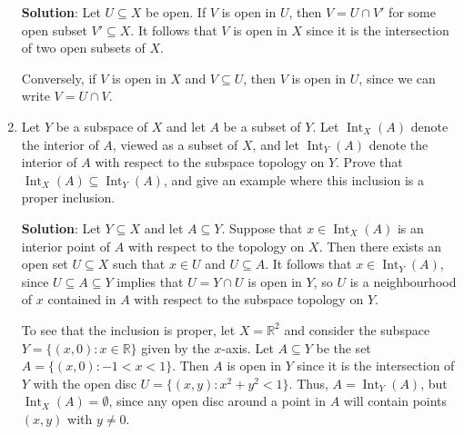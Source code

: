 \documentclass[letterpaper,12pt]{article}
\newcommand{\R}{\mathbb{R}}
\DeclareMathOperator{\Int}{Int}
\begin{document}
\begin{enumerate}
\bigskip

{\bf Solution}: Let $U\subseteq X$ be open. If $V$ is open in $U$, then $V = U\cap V'$ for some open subset $V'\subseteq X$. It follows that $V$ is open in $X$ since it is the intersection of two open subsets of $X$.

Conversely, if $V$ is open in $X$ and $V\subseteq U$, then $V$ is open in $U$, since we can write $V = U\cap V$.

\item Let $Y$ be a subspace of $X$ and let $A$ be a subset of $Y$. Let $\Int_X(A)$ denote the interior of $A$, viewed as a subset of $X$, and let $\Int_Y(A)$ denote the interior of $A$ with respect to the subspace topology on $Y$. Prove that $\Int_X(A)\subseteq \Int_Y(A)$, and give an example where this inclusion is a proper inclusion.

\bigskip

{\bf Solution}: Let $Y\subseteq X$ and let $A\subseteq Y$. Suppose that $x\in \Int_X(A)$ is an interior point of $A$ with respect to the topology on $X$. Then there exists an open set $U\subseteq X$ such that $x\in U$ and $U\subseteq A$. It follows that $x\in \Int_Y(A)$, since $U\subseteq A\subseteq Y$ implies that $U=Y\cap U$ is open in $Y$, so $U$ is a neighbourhood of $x$ contained in $A$ with respect to the subspace topology on $Y$.

To see that the inclusion is proper, let $X=\R^2$ and consider the subspace $Y=\{(x,0):x\in \R\}$ given by the $x$-axis. Let $A\subseteq Y$ be the set $A=\{(x,0): -1<x<1\}$. Then $A$ is open in $Y$ since it is the intersection of $Y$ with the open disc $U=\{(x,y):x^2+y^2<1\}$. Thus, $A=\Int_Y(A)$, but $\Int_X(A)=\emptyset$, since any open disc around a point in $A$ will contain points $(x,y)$ with $y\neq 0$.

\end{enumerate}
\end{document}
